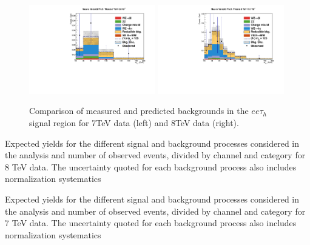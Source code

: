 \begin{figure}
\begin{center}
  \includegraphics[width=0.49\textwidth]{4_Analisys/pics/7TeV/plots/eet/LTCut_7TeV/final-subMass-LTCut_7TeV.pdf}
  \includegraphics[width=0.49\textwidth]{4_Analisys/pics/8TeV/plots/eet/LTCut_8TeV/final-subMass-LTCut_8TeV.pdf}\\
  \caption{Comparison of measured and predicted backgrounds in the $ee\tau_h$ signal region for 7TeV data (left) and 8TeV data (right).}
  \label{fig:LLT_eet_prefit}
\end{center}
\end{figure}


\begin{table}
\caption{Expected yields for the different signal and background processes considered in the analysis and number of observed events, divided by channel and category for 8 TeV data. The uncertainty quoted for each background process also includes normalization systematics}

\label{tab:prefit_yields_table_8TeV}
\end{table}

\begin{table}
\caption{Expected yields for the different signal and background processes considered in the analysis and number of observed events, divided by channel and category for 7 TeV data. The uncertainty quoted for each background process also includes normalization systematics}

\label{tab:prefit_yields_table_7TeV}
\end{table}


